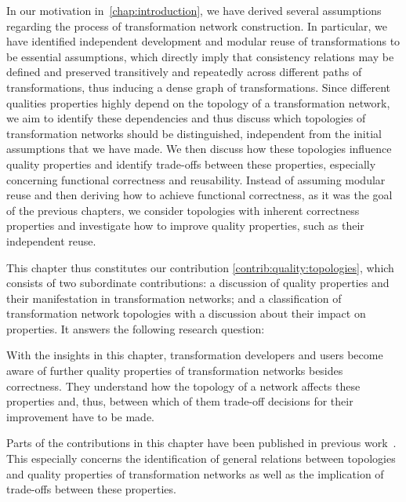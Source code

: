 In our motivation in~\autoref{chap:introduction}, we have derived several assumptions regarding the process of transformation network construction.
In particular, we have identified independent development and modular reuse of transformations to be essential assumptions, which directly imply that consistency relations may be defined and preserved transitively and repeatedly across different paths of transformations, thus inducing a dense graph of transformations.
Since different qualities properties highly depend on the topology of a transformation network, we aim to identify these dependencies and thus discuss which topologies of transformation networks should be distinguished, independent from the initial assumptions that we have made.
We then discuss how these topologies influence quality properties and identify trade-offs between these properties, especially concerning functional correctness and reusability.
Instead of assuming modular reuse and then deriving how to achieve functional correctness, as it was the goal of the previous chapters, we consider topologies with inherent correctness properties and investigate how to improve quality properties, such as their independent reuse.

This chapter thus constitutes our contribution \autoref{contrib:quality:topologies}, which consists of two subordinate contributions: a discussion of quality properties and their manifestation in transformation networks; and a classification of transformation network topologies with a discussion about their impact on properties.
It answers the following research question:


With the insights in this chapter, transformation developers and users become aware of further quality properties of transformation networks besides correctness.
They understand how the topology of a network affects these properties and, thus, between which of them trade-off decisions for their improvement have to be made.

Parts of the contributions in this chapter have been published in previous work~.
This especially concerns the identification of general relations between topologies and quality properties of transformation networks as well as the implication of trade-offs between these properties.





